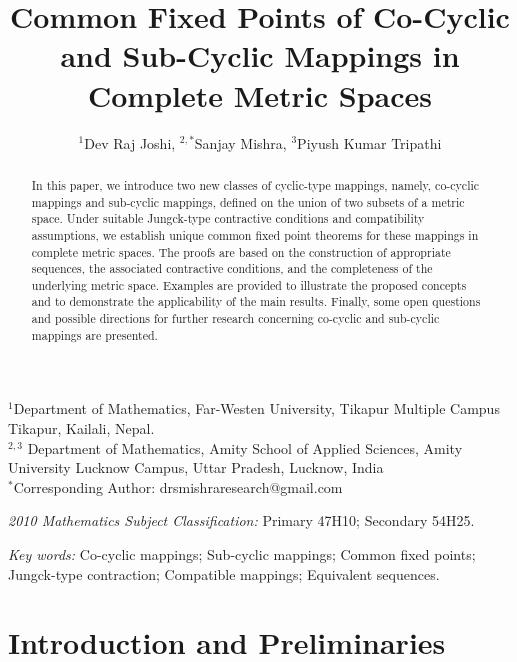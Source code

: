 \documentclass[11pt,a4paper,margin=1in]{amsart}
\theoremstyle{plain}
\theoremstyle{definition}
\theoremstyle{remark}
\begin{document}
\title[Co-Cyclic and Sub-Cyclic Mappings]{Common Fixed Points of Co-Cyclic and Sub-Cyclic Mappings in Complete Metric Spaces}
\author{$^1$Dev Raj Joshi,  $^{2, \ast}$Sanjay Mishra,  $^3$Piyush Kumar Tripathi}
\maketitle
\begin{center}
{
\footnotesize $^1$Department of Mathematics, Far-Westen University, Tikapur Multiple Campus Tikapur, Kailali, Nepal.\\ $^{2, 3}$ Department of Mathematics, Amity School of Applied Sciences, Amity University Lucknow Campus, Uttar Pradesh, Lucknow, India \\

$^{\ast}$Corresponding Author: drsmishraresearch@gmail.com}
\end{center}

\begin{abstract}
In this paper, we introduce two new classes of cyclic-type mappings, namely,
co-cyclic mappings and sub-cyclic mappings, defined on the union of two
subsets of a metric space. Under suitable Jungck-type contractive conditions
and compatibility assumptions, we establish unique common fixed point
theorems for these mappings in complete metric spaces. The proofs are based
on the construction of appropriate sequences, the associated contractive
conditions, and the completeness of the underlying metric space. Examples
are provided to illustrate the proposed concepts and to demonstrate the
applicability of the main results. Finally, some open questions and possible
directions for further research concerning co-cyclic and sub-cyclic mappings
are presented.
\end{abstract}


\noindent\emph{2010 Mathematics Subject Classification:} Primary 47H10; Secondary 54H25.

\noindent\emph{Key words:} Co-cyclic mappings; Sub-cyclic mappings; Common fixed points; Jungck-type contraction; Compatible mappings; Equivalent sequences.

\section{Introduction and Preliminaries}
\label{sec:Introduction and Preliminaries}
\end{document}
